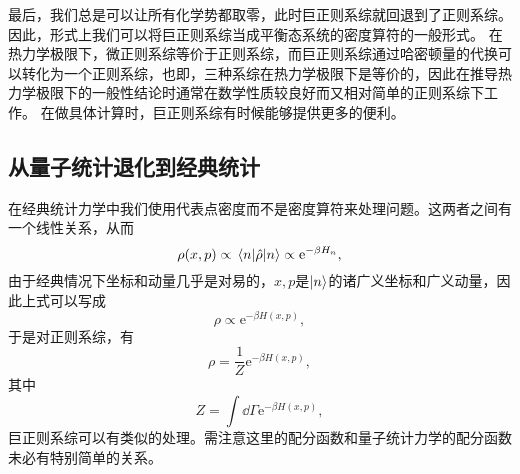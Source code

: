 \documentclass[hyperref, UTF8, a4paper]{ctexart}
\newcommand*{\ee}{\mathrm{e}}
\begin{document}
最后，我们总是可以让所有化学势都取零，此时巨正则系综就回退到了正则系综。因此，形式上我们可以将巨正则系综当成平衡态系统的密度算符的一般形式。
在热力学极限下，微正则系综等价于正则系综，而巨正则系综通过哈密顿量的代换可以转化为一个正则系综，也即，三种系综在热力学极限下是等价的，因此在推导热力学极限下的一般性结论时通常在数学性质较良好而又相对简单的正则系综下工作。
在做具体计算时，巨正则系综有时候能够提供更多的便利。

\subsection{从量子统计退化到经典统计}

在经典统计力学中我们使用代表点密度而不是密度算符来处理问题。这两者之间有一个线性关系，从而
\[
    \rho(x, p) \propto \mel{n}{\hat{\rho}}{n} \propto \ee^{- \beta H_n},
\]
由于经典情况下坐标和动量几乎是对易的，$x, p$是$\ket{n}$的诸广义坐标和广义动量，因此上式可以写成
\[
    \rho \propto \ee^{-\beta H(x, p)},
\]
于是对正则系综，有
\begin{equation}
    \rho = \frac{1}{Z} \ee^{- \beta H(x, p)},
\end{equation}
其中
\begin{equation}
    Z = \int \dd{\Gamma} \ee^{- \beta H(x, p)},
\end{equation}
巨正则系综可以有类似的处理。需注意这里的配分函数和量子统计力学的配分函数未必有特别简单的关系。
\end{document}
